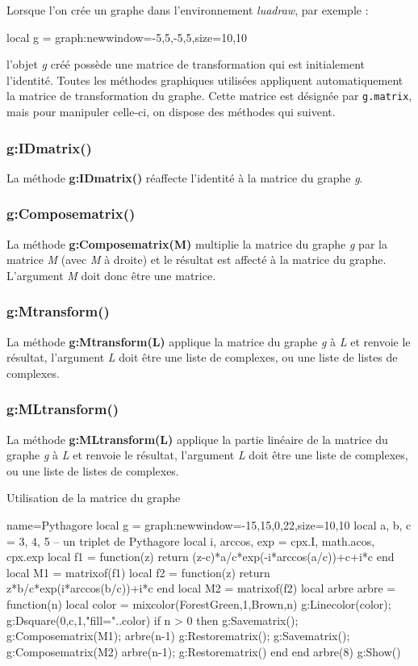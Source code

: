Lorsque l'on crée un graphe dans l'environnement \emph{luadraw}, par exemple :
\begin{Luacode}
local g = graph:new{window={-5,5,-5,5},size={10,10}}
\end{Luacode}
l'objet \emph{g} créé possède une matrice de transformation qui est initialement l'identité. Toutes les méthodes graphiques utilisées appliquent automatiquement la matrice de transformation du graphe. Cette matrice est désignée par \texttt{g.matrix}, mais pour manipuler celle-ci, on dispose des méthodes qui suivent.

\subsubsection{g:IDmatrix()}
La méthode \textbf{g:IDmatrix()} réaffecte l'identité à la matrice du graphe \emph g.

\subsubsection{g:Composematrix()}
La méthode \textbf{g:Composematrix(M)} multiplie la matrice du graphe \emph g par la matrice \emph{M} (avec \emph{M} à droite) et le résultat est affecté à la matrice du graphe. L'argument \emph{M} doit donc être une matrice.

\subsubsection{g:Mtransform()}
La méthode \textbf{g:Mtransform(L)} applique la matrice du graphe \emph g à \emph{L} et renvoie le résultat, l'argument \emph L doit être une liste de complexes, ou une liste de listes de complexes.

\subsubsection{g:MLtransform()}
La méthode \textbf{g:MLtransform(L)} applique la partie linéaire de la matrice du graphe \emph g à \emph{L} et renvoie le résultat, l'argument \emph L doit être une liste de complexes, ou une liste de listes de complexes.

\begin{demo}{Utilisation de la matrice du graphe}
\begin{luadraw}{name=Pythagore}
local g = graph:new{window={-15,15,0,22},size={10,10}}
local a, b, c = 3, 4, 5 -- un triplet de Pythagore
local i, arccos, exp = cpx.I, math.acos, cpx.exp
local f1 = function(z)
        return (z-c)*a/c*exp(-i*arccos(a/c))+c+i*c end
local M1 = matrixof(f1)
local f2 = function(z)
        return z*b/c*exp(i*arccos(b/c))+i*c end
local M2 = matrixof(f2)
local arbre
arbre = function(n)
    local color = mixcolor(ForestGreen,1,Brown,n)
    g:Linecolor(color); g:Dsquare(0,c,1,"fill="..color)
    if n > 0 then
        g:Savematrix(); g:Composematrix(M1); arbre(n-1)
        g:Restorematrix(); g:Savematrix(); g:Composematrix(M2)
        arbre(n-1); g:Restorematrix()
    end
end
arbre(8)
g:Show()
\end{luadraw}
\end{demo}


